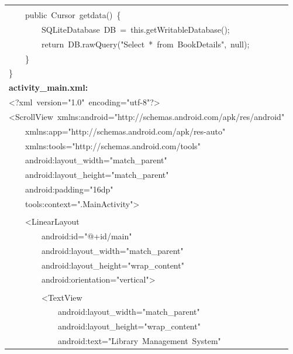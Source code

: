 \documentclass[a4paper,12pt]{article}
\begin{document}
\begin{longtable}{|p{}|}
\strut \\
{\ttfamily\small \ \ \ \ public\ Cursor\ getdata()\ \{} \\
{\ttfamily\small \ \ \ \ \ \ \ \ SQLiteDatabase\ DB\ =\ this.getWritableDatabase();} \\
{\ttfamily\small \ \ \ \ \ \ \ \ return\ DB.rawQuery("Select\ *\ from\ BookDetails",\ null);} \\
{\ttfamily\small \ \ \ \ \}} \\
{\ttfamily\small \}} \\
\hline
\rule{0pt}{13pt}\textbf{activity\_main.xml:} \\
\hline
{\ttfamily\small \textless{}?xml\ version="1.0"\ encoding="utf-8"?\textgreater{}} \\
{\ttfamily\small \textless{}ScrollView\ xmlns:android="http://schemas.android.com/apk/res/android"} \\
{\ttfamily\small \ \ \ \ xmlns:app="http://schemas.android.com/apk/res-auto"} \\
{\ttfamily\small \ \ \ \ xmlns:tools="http://schemas.android.com/tools"} \\
{\ttfamily\small \ \ \ \ android:layout\_width="match\_parent"} \\
{\ttfamily\small \ \ \ \ android:layout\_height="match\_parent"} \\
{\ttfamily\small \ \ \ \ android:padding="16dp"} \\
{\ttfamily\small \ \ \ \ tools:context=".MainActivity"\textgreater{}} \\
\strut \\
{\ttfamily\small \ \ \ \ \textless{}LinearLayout} \\
{\ttfamily\small \ \ \ \ \ \ \ \ android:id="@+id/main"} \\
{\ttfamily\small \ \ \ \ \ \ \ \ android:layout\_width="match\_parent"} \\
{\ttfamily\small \ \ \ \ \ \ \ \ android:layout\_height="wrap\_content"} \\
{\ttfamily\small \ \ \ \ \ \ \ \ android:orientation="vertical"\textgreater{}} \\
\strut \\
{\ttfamily\small \ \ \ \ \ \ \ \ \textless{}TextView} \\
{\ttfamily\small \ \ \ \ \ \ \ \ \ \ \ \ android:layout\_width="match\_parent"} \\
{\ttfamily\small \ \ \ \ \ \ \ \ \ \ \ \ android:layout\_height="wrap\_content"} \\
{\ttfamily\small \ \ \ \ \ \ \ \ \ \ \ \ android:text="Library\ Management\ System"} \\

\end{longtable}
\end{document}
